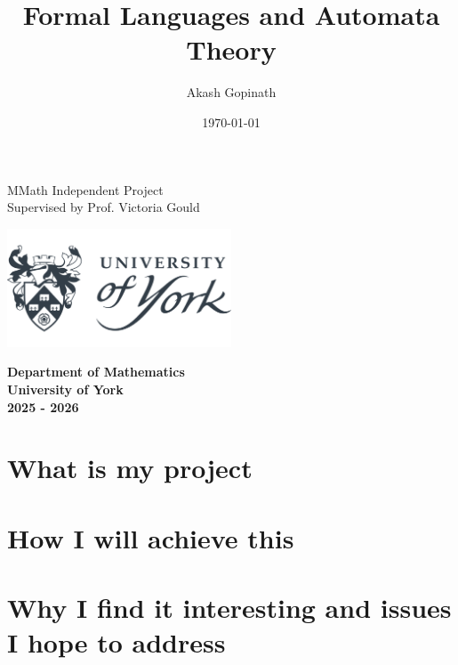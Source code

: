 \documentclass[11pt]{report}
\title{\Huge\textbf{Formal Languages and Automata Theory}}
\author{\large Akash Gopinath}
\date{\today}
\begin{document}
{
\let\newpage\relax
\maketitle
\begin{center}
	\vfill
	\Large
	MMath Independent Project \\
	Supervised by Prof. Victoria Gould

	\vspace{0.4cm}
	\includegraphics[width=0.5\textwidth]{university.png}

	\textbf{
		Department of Mathematics \\
		University of York \\
		2025 - 2026	}
\end{center}
}
\titlepage

\pagestyle{fancy}


\tableofcontents
\newpage


%

\chapter{What is my project}

\newpage



\chapter{How I will achieve this}

\newpage

\chapter{Why I find it interesting and issues I hope to address}

\newpage
\end{document}
